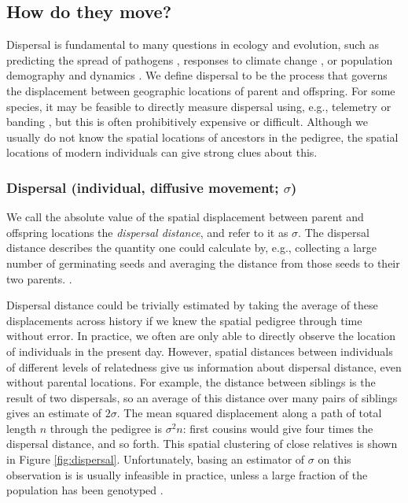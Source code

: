 \documentclass{ar-1col}
\newcommand{\g}[1]{{\color{blue}{#1}}}
\renewcommand{\emph}[1]{{\textit{#1}}}
\begin{document}
\subsection{How do they move?}

Dispersal is fundamental to many questions in ecology and evolution,
such as
predicting the spread of pathogens \citep{BiekReal2010},
responses to climate change \citep{parmesan2006},
or population demography and dynamics \citep{schreiber2010interactive}.
We define dispersal to be the process that governs 
the displacement between geographic locations of parent and offspring.
For some species,
it may be feasible to directly measure dispersal 
using, e.g., telemetry or banding \citep{Cayuela2018demographic},
but this is often prohibitively expensive or difficult.
Although we usually do not know the spatial locations of ancestors in the pedigree,
the spatial locations of modern individuals can give strong clues about this.


\subsubsection{Dispersal (individual, diffusive movement; $\sigma$)}

We call the absolute value of the spatial displacement between parent and offspring locations
the \emph{dispersal distance}, and refer to it as $\sigma$.
The dispersal distance describes the quantity one could calculate by,
e.g., collecting a large number of germinating seeds
and averaging the distance from those seeds to their two parents.
\g{It determines how quickly spatial populations mix}.

Dispersal distance could be trivially estimated by taking
the average of these displacements across history
if we knew the spatial pedigree through time without error.
In practice, we often are only able to directly observe
the location of individuals in the present day.
However, 
spatial distances between individuals of different levels of relatedness
give us information about dispersal distance, even without parental locations.
For example,
the distance between siblings is the result of two dispersals,
so an average of this distance over many pairs of siblings 
gives an estimate of $2 \sigma$.
The mean squared displacement along
a path of total length $n$ through the pedigree is $\sigma^2 n$:
first cousins would give four times the dispersal distance, and so forth.
This spatial clustering of close relatives
is shown in Figure \ref{fig:dispersal}.
Unfortunately, basing an estimator of $\sigma$ on this observation
is is usually infeasible in practice,
unless a large fraction of the population has been genotyped
\citep[e.g.,][]{Aguillon2017deconstructing}.
\end{document}

